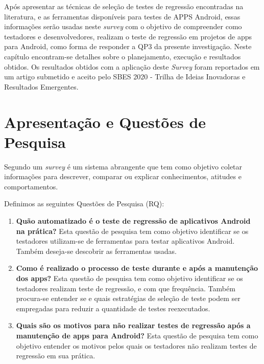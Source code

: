 \acresetall 

Após apresentar as técnicas de seleção de testes de regressão encontradas na literatura, e as ferramentas disponíveis para testes de \ac{APPS} Android, essas informações serão usadas neste \textit{survey} com o objetivo de compreender como testadores e desenvolvedores, realizam o teste de regressão em projetos de apps para Android, como forma de responder a QP3 da presente investigação. Neste capítulo encontram-se detalhes sobre o planejamento, execução e resultados obtidos.
Os resultados obtidos com a aplicação deste \textit{Survey} foram reportados em um artigo submetido e aceito pelo SBES 2020 - Trilha de Ideias Inovadoras e Resultados Emergentes.


\section{Apresentação e Questões de Pesquisa}\label{rqsurvey}

Segundo \cite{PSK2001} um \textit{survey} é um sistema abrangente que tem como objetivo coletar informações para descrever, comparar ou explicar conhecimentos, atitudes e comportamentos. %

Definimos as seguintes Questões de Pesquisa (RQ):

\begin{enumerate}[label=\bf QP\arabic*,leftmargin=1.8cm]
    
    \item \textbf{Quão automatizado é o teste de regressão de aplicativos Android na prática?} Esta questão de pesquisa tem como objetivo identificar se os testadores utilizam-se de ferramentas para testar aplicativos Android. Também deseja-se descobrir as ferramentas usadas.
    
    \item \textbf{Como é realizado o processo de teste durante e após a manutenção dos apps?} Esta questão de pesquisa tem como objetivo identificar se os testadores realizam teste de regressão, e com que frequência. Também procura-se entender se e quais estratégias de seleção de teste podem ser empregadas para reduzir a quantidade de testes reexecutados.
    
    \item \textbf{Quais são os motivos para não realizar testes de regressão após a manutenção de apps para Android?} Esta questão de pesquisa tem como objetivo entender os motivos pelos quais os testadores não realizam testes de regressão em sua prática.
    
\end{enumerate}

